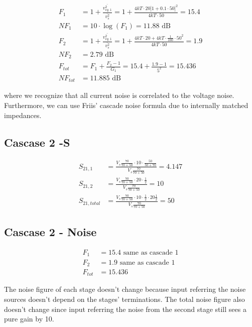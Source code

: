 \begin{enumerate}[label=(\alph*)]
    \begin{align*}
        F_1 &= 1 + \frac{\overline{v_{eq,1}^2}}{\overline{v_s^2}} = 1 + \frac{4kT\cdot 20 |1 + 0.1 \cdot 50|^2}{4kT \cdot 50} = 15.4 \\
        NF_1 &= 10 \cdot \log(F_1) = 11.88 \text{ dB} \\
        F_2 &= 1 + \frac{\overline{v_{eq,1}^2}}{\overline{v_s^2}} = 1 + \frac{4kT \cdot 20 + 4kT \cdot \frac{1}{100} \cdot 50^2}{4kT \cdot 50} = 1.9 \\
        NF_2 &= 2.79 \text{ dB} \\
        F_{tot} &= F_1 + \frac{F_2 - 1}{G_1} = 15.4 + \frac{1.9-1}{5^2} = 15.436 \\
        NF_{tot} &= 11.885 \text{ dB}
    \end{align*}

    where we recognize that all current noise is correlated to the voltage noise. Furthermore, we can use Friis' cascade noise formula due to internally matched impedances.

    \subsection{Cascase 2 -S}
    \begin{align*}
        S_{21,1} &= \frac{V_s \frac{70}{70 + 50} \cdot 10 \cdot \frac{50}{50 + 70}}{V_s \frac{70}{70+50}} = 4.147 \\
        S_{21,2} &= \frac{V_s \frac{70}{70 + 50} \cdot 20 \cdot \frac{1}{2}}{V_s \frac{70}{70+50}} = 10 \\
        S_{21,total} &= \frac{V_s \frac{70}{70+50} \cdot 10 \cdot \frac{1}{2} \cdot 20 \frac{1}{2}}{V_s \frac{70}{70+50}} = 50
    \end{align*}

    \subsection{Cascase 2 - Noise}
    \begin{align*}
        F_1 &= 15.4 \text{ same as cascade 1} \\
        F_2 &= 1.9 \text{ same as cascade 1} \\
        F_{tot} &= 15.436
    \end{align*}

    The noise figure of each stage doesn't change because input referring the noise sources doesn't depend on the stages' terminations. The total noise figure also doesn't change since input referring the noise from the second stage still sees a pure gain by 10.


\end{enumerate}
